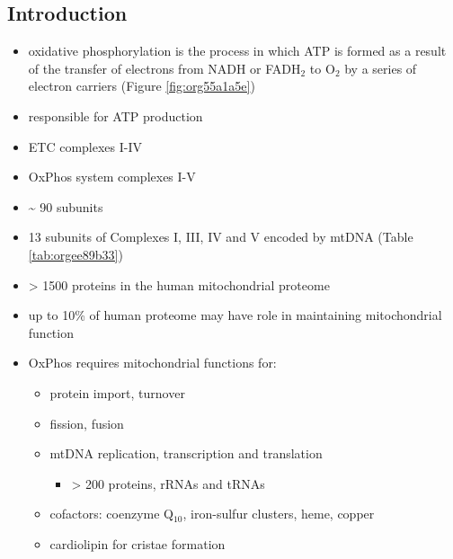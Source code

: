 \documentclass{scrartcl}
\begin{document}
\subsection{Introduction}
\label{sec:org6595098}
\begin{itemize}
\item oxidative phosphorylation is the process in which ATP is formed as a
result of the transfer of electrons from NADH or FADH\(_{\text{2}}\) to O\(_{\text{2}}\) by a
series of electron carriers (Figure \ref{fig:org55a1a5e})
\item responsible for ATP production
\item ETC complexes I-IV
\item OxPhos system complexes I-V
\item \textasciitilde{} 90 subunits
\item 13 subunits of Complexes I, III, IV and V encoded by mtDNA (Table \ref{tab:orgee89b33})
\item \textgreater{} 1500 proteins in the human mitochondrial proteome
\item up to 10\% of human proteome may have role in maintaining mitochondrial function
\item OxPhos requires mitochondrial functions for:
\begin{itemize}
\item protein import, turnover
\item fission, fusion
\item mtDNA replication, transcription and translation
\begin{itemize}
\item \textgreater{} 200 proteins, rRNAs and tRNAs
\end{itemize}
\item cofactors: coenzyme Q\(_{\text{10}}\), iron-sulfur clusters, heme, copper
\item cardiolipin for cristae formation
\end{itemize}


\end{itemize}
\end{document}
